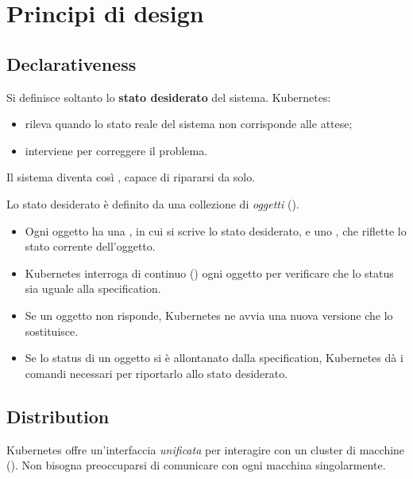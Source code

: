 \section{Principi di design}
\label{sec:k8s-principi}

\subsection{Declarativeness}

Si definisce soltanto lo \textbf{stato desiderato} del sistema. Kubernetes:
\begin{itemize}
  \item rileva quando lo stato reale del sistema non corrisponde alle attese;
  \item interviene per correggere il problema.
\end{itemize}
Il sistema diventa così , capace di ripararsi da solo.

Lo stato desiderato è definito da una collezione di \emph{oggetti} ().
\begin{itemize}
  \item Ogni oggetto ha una , in cui si scrive lo stato desiderato, e uno , che
    riflette lo stato corrente dell'oggetto.
  \item Kubernetes interroga di continuo () ogni oggetto per verificare che lo status sia uguale alla
    specification.
  \item Se un oggetto non risponde, Kubernetes ne avvia una nuova versione che lo sostituisce.
  \item Se lo status di un oggetto si è allontanato dalla specification, Kubernetes dà i comandi necessari per
    riportarlo allo stato desiderato.
\end{itemize}

\subsection{Distribution}

Kubernetes offre un'interfaccia \emph{unificata} per interagire con un cluster di macchine
(). Non bisogna preoccuparsi di comunicare con ogni macchina singolarmente.

